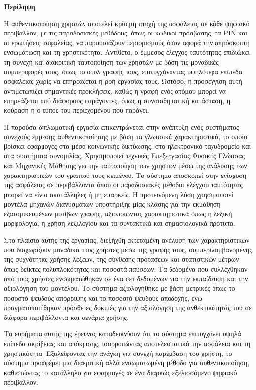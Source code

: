 \begin{center}
  \centering

  \vspace{0.5cm}
  \centering
  \textbf{\Large{Περίληψη}}

  \vspace{1cm}

\end{center}

 Η αυθεντικοποίηση χρηστών αποτελεί κρίσιμη πτυχή της ασφάλειας σε κάθε ψηφιακό περιβάλλον, με τις παραδοσιακές μεθόδους, όπως οι κωδικοί πρόσβασης, τα PIN και οι ερωτήσεις ασφαλείας, να παρουσιάζουν περιορισμούς όσον αφορά την απρόσκοπτη ενσωμάτωση και τη χρηστικότητα. Αντίθετα, ο έμμεσος έλεγχος ταυτότητας επιδιώκει τη συνεχή και διακριτική ταυτοποίηση των χρηστών με βάση τις μοναδικές συμπεριφορές τους, όπως το στυλ γραφής τους, επιτυγχάνοντας υψηλότερα επίπεδα ασφάλειας χωρίς να επηρεάζεται η ροή εργασίας τους. Ωστόσο, η προσέγγιση αυτή αντιμετωπίζει σημαντικές προκλήσεις, καθώς η γραφή ενός ατόμου μπορεί να επηρεάζεται από διάφορους παράγοντες, όπως η συναισθηματική κατάσταση, η κούραση ή ο τύπος του περιεχομένου που παράγει.

Η παρούσα διπλωματική εργασία επικεντρώνεται στην ανάπτυξη ενός συστήματος συνεχούς έμμεσης αυθεντικοποίησης με βάση τα γλωσσικά χαρακτηριστικά, το οποίο βρίσκει εφαρμογές στα μέσα κοινωνικής δικτύωσης, στο ηλεκτρονικό ταχυδρομείο και στα συστήματα συνομιλίας. Χρησιμοποιεί τεχνικές Επεξεργασίας Φυσικής Γλώσσας και Μηχανικής Μάθησης για την ταυτοποίηση των χρηστών μέσω της ανάλυσης των χαρακτηριστικών του γραπτού τους κειμένου. Το σύστημα αποσκοπεί στην ενίσχυση της ασφάλειας σε περιβάλλοντα όπου οι παραδοσιακές μέθοδοι ελέγχου ταυτότητας μπορεί να είναι ακατάλληλες ή μη επαρκείς. Η προτεινόμενη λύση χρησιμοποιεί μοντέλα μηχανών διανυσμάτων υποστήριξης μίας κλάσης για την εκμάθηση εξατομικευμένων μοτίβων γραφής, αξιοποιώντας χαρακτηριστικά όπως η λεξική μορφολογία, η χρήση λεξιλογίου και τα συντακτικά και σημασιολογικά πρότυπα.

Στο πλαίσιο αυτής της εργασίας, διεξήχθη εκτεταμένη ανάλυση των χαρακτηριστικών που διαχωρίζουν μοναδικά τους χρήστες μέσω της γραφής τους, συμπεριλαμβανομένης της συχνότητας χρήσης λέξεων, της σύνθεσης προτάσεων και στατιστικών μέτρων όπως δείκτες πολυπλοκότητας και ποσοστά παύσεων. Τα δεδομένα που συλλέχθηκαν από τους χρήστες ενσωματώθηκαν σε ένα σετ δεδομένων για την εκπαίδευση και την αξιολόγηση του μοντέλου. Το σύστημα αξιολογήθηκε με βάση μετρικές όπως το ποσοστό ψευδούς απόρριψης και το ποσοστό ψευδούς αποδοχής, ενώ πραγματοποιήθηκαν πρόσθετες δοκιμές για την αξιολόγηση της ανθεκτικότητάς του σε διάφορα περιβάλλοντα και σενάρια χρήσης.

Τα ευρήματα αυτής της έρευνας καταδεικνύουν ότι το σύστημα επιτυγχάνει υψηλά επίπεδα ακρίβειας και απόκρισης, ισορροπώντας αποτελεσματικά την ασφάλεια και τη χρηστικότητα. Εξαλείφοντας την ανάγκη για συνεχή παρέμβαση του χρήστη, το σύστημα προσφέρει μια διακριτική αλλά ενσωματωμένη μέθοδο για αυθεντικοποίηση, καθιστώντας το κατάλληλο για εφαρμογές σε ένα διαρκώς εξελισσόμενο ψηφιακό περιβάλλον. 


